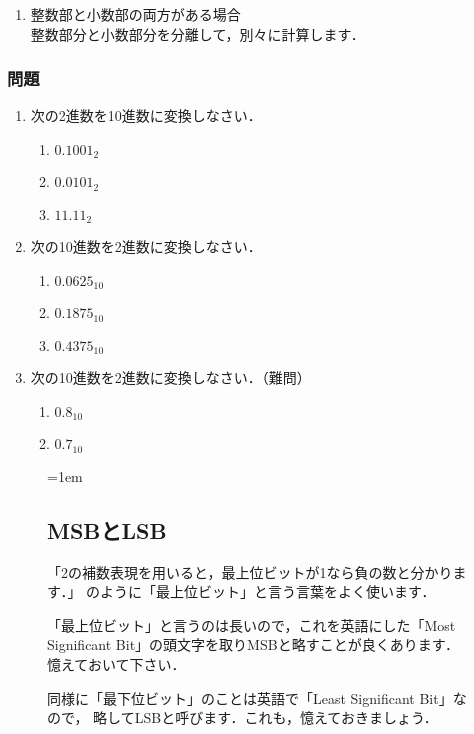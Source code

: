 \begin{enumerate}
\item 整数部と小数部の両方がある場合 \\
整数部分と小数部分を分離して，別々に計算します．
\end{enumerate}

\subsubsection{問題}
\begin{enumerate}
\item 次の2進数を10進数に変換しなさい．
\begin{enumerate}
\item $0.1001_2$
\item $0.0101_2$
\item $11.11_2$
\end{enumerate}

\item 次の10進数を2進数に変換しなさい．
\begin{enumerate}
\item $0.0625_{10}$
\item $0.1875_{10}$
\item $0.4375_{10}$
\end{enumerate}

\item 次の10進数を2進数に変換しなさい．（難問）
\begin{enumerate}
\item $0.8_{10}$
\item $0.7_{10}$
\end{enumerate}
\end{enumerate}

\begin{figure}[tbp]
\begin{framed}{\parindent=1em
\subsection*{MSBとLSB}
「2の補数表現を用いると，最上位ビットが1なら負の数と分かります．」
のように「最上位ビット」と言う言葉をよく使います．

「最上位ビット」と言うのは長いので，これを英語にした「Most Significant
Bit」の頭文字を取りMSBと略すことが良くあります．憶えておいて下さい．

同様に「最下位ビット」のことは英語で「Least Significant Bit」なので，
略してLSBと呼びます．これも，憶えておきましょう．
}\end{framed}
\end{figure}

